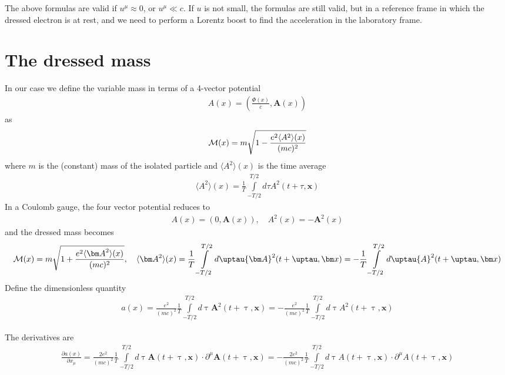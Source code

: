 The above formulas are valid if $u^\mu\approx 0$, or $u^\mu\ll c $. If $u$ is not small, the formulas are still valid, but in a reference frame in which the dressed electron is at rest, and we need to perform a Lorentz boost to find the acceleration in the laboratory frame.





\section{The dressed mass}

In our case we define the variable mass in terms of a 4-vector potential
\begin{align}
 A(x) = \left(\frac{ \Phi(x)}c,{\bm A}(x)\right)
\end{align}
as
\begin{align}
 {\cal M}(x) = m\sqrt{1-\frac{e^2\langle A^2\rangle (x)}{(mc)^2}}
\end{align}
where $m$ is the (constant) mass of the isolated particle and $ \langle A^2\rangle(x) $ is the time average
\begin{align}
 \langle A^2\rangle (x)= \frac 1{T} \int\limits_{-T/2}^{T/2}d\tau A^2(t+\tau, {\bm x})
\end{align}
In  a Coulomb gauge, the four vector potential reduces to
\begin{align}
 A(x) = \left(0, {\bm A}(x)\right), \quad A^2(x) = -{\bm A}^2(x)
\end{align}
and the dressed mass becomes
\begin{align}
 {\cal M}(x) =m\sqrt{1+\frac{e^2\langle {\bm A}^2\rangle(x)}{(mc)^2}},\quad \langle {\bm A}^2\rangle (x)= \frac 1{T} \int\limits_{-T/2}^{T/2}d\uptau {\bm A}^2(t+\uptau, {\bm x}) = -\frac 1{T} \int\limits_{-T/2}^{T/2}d\uptau { A}^2(t+\uptau, {\bm x})
\end{align}
Define the dimensionless quantity
\begin{align}
 a(x) = \frac{e^2}{(mc)^2}\frac1T\int\limits_{-T/2}^{T/2} d \uptau {\bm A}^2(t+\uptau, {\bm x})= -\frac{e^2}{(mc)^2}\frac1T\int\limits_{-T/2}^{T/2} d \uptau { A}^2(t+\uptau, {\bm x})
\end{align}

The derivatives are
\begin{align}
 \frac{\partial a(x)}{\partial x_{\mu}}= \frac{2e^2}{(mc)^2}\frac1T\int\limits_{-T/2}^{T/2} d \uptau {\bm A}(t+\uptau, {\bm x})\cdot \partial^\mu {\bm A}(t+\uptau, {\bm x})=- \frac{2e^2}{(mc)^2}\frac1T\int\limits_{-T/2}^{T/2} d \uptau { A}(t+\uptau, {\bm x})\cdot \partial^\mu { A}(t+\uptau, {\bm x})
\end{align}


